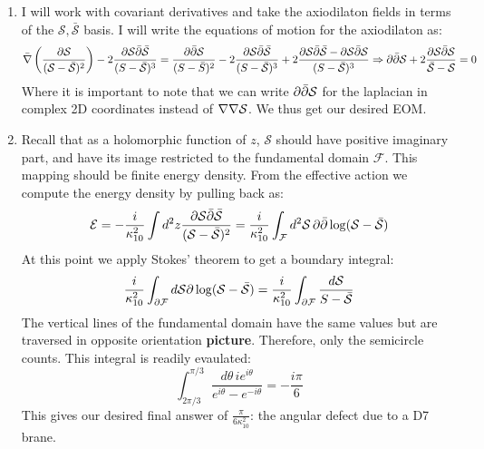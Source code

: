 \documentclass[11pt, class=article, crop=false]{standalone}
\begin{document}
\begin{enumerate}
	
	\item I will work with covariant derivatives and take the axiodilaton fields in terms of the $\mathcal S, \bar{\mathcal S}$ basis. I will write the equations of motion for the axiodilaton as:
	\[
		\bar \nabla \left(\frac{\d \S}{(\S- \bar \S)^2} \right) - 2 \frac{\d \S \bar \d \bar {\S}}{(S - \bar{\S})^3} = \frac{\d \bar \d \mathcal S}{(S-\bar S)^2} - 2 \frac{\d \S \bar \d \bar {\S}}{(S - \bar{\S})^3} + 2 \frac{\d \S \bar \d \bar {\S} - \d \S \bar \d \S}{(S - \bar{\S})^3} \Rightarrow \d \bar \d \S + 2 \frac{\d \S \bar \d \S}{\bar \S - \S} = 0
	\]
	Where it is important to note that we can write $\d \bar \d \S$ for the laplacian in complex 2D coordinates instead of $\nabla \nabla \S$. We thus get our desired EOM. 
	
	\item Recall that as a holomorphic function of $z$, $\mathcal S$ should have positive imaginary part, and have its image restricted to the fundamental domain $\mathcal F$. This mapping should be finite energy density. From the effective action we compute the energy density by pulling back as:
	\[
		\mathcal E = -\frac{i}{\kappa_{10}^2} \int d^2 z \frac{\d \mathcal S \bar \d \bar {\mathcal S}}{(\mathcal S - \bar {\mathcal S})^2} = \frac{i}{\kappa_{10}^2} \int_{\mathcal F} d^2 {\mathcal S} \, \d \bar \d \log(\mathcal S - \bar {\mathcal S})
	\]
	At this point we apply Stokes' theorem to get a boundary integral:
	\[
		\frac{i}{\kappa_{10}^2} \int_{\d \mathcal F} d \mathcal S \d \log(\mathcal S - \bar{\mathcal S}) = \frac{i}{\kappa_{10}^2} \int_{\d \mathcal F} \frac{d \mathcal S}{S - \bar{\mathcal S}}
	\]
	The vertical lines of the fundamental domain have the same values but are traversed in opposite orientation \textbf{picture}. Therefore, only the semicircle counts. This integral is readily evaulated:
	\[
		\int_{2 \pi /3}^{\pi/3} \frac{d \theta\, i e^{i \theta}}{e^{i \theta} - e^{-i \theta}} = -\frac{i \pi}{6}
	\]
	This gives our desired final answer of $\frac{\pi}{6 \kappa_{10}^2}$: the angular defect due to a D7 brane.
	
\end{enumerate}

\end{document}
